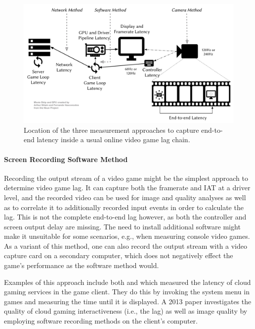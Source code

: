 \begin{figure}[!t]
    \centering
    \includegraphics[width=1.0\columnwidth]{../models/e2e-lag.pdf}
    \caption{Location of the three measurement approaches to capture end-to-end latency inside a usual online video game lag chain.}
\label{fig:measurement-methods}
\end{figure}


\paragraph{Screen Recording Software Method}
Recording the output stream of a video game might be the simplest approach to determine video game lag. It can capture both the framerate and \gls{IAT} at a driver level, and the recorded video can be used for image and quality analyses as well as to correlate it to additionally recorded input events in order to calculate the lag. This is not the complete end-to-end lag however, as both the controller and screen output delay are missing. The need to install additional software might make it unsuitable for some scenarios, e.g., when measuring console video games. As a variant of this method, one can also record the output stream with a video capture card on a secondary computer, which does not negatively effect the game's performance as the software method would.

Examples of this approach include both \cite{Chen:2011:MLC:2072298.2071991} and \cite{6670099} which measured the latency of cloud gaming services in the game client. They do this by invoking the system menu in games and measuring the time until it is displayed. A 2013 paper \cite{6574660} investigates the quality of cloud gaming interactiveness (i.e., the lag) as well as image quality by employing software recording methods on the client's computer.


